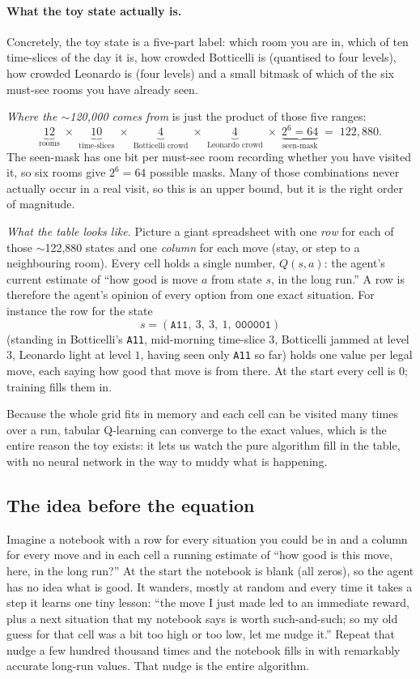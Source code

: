 \documentclass[11pt]{article}
\begin{document}
\paragraph{What the toy state actually is.} Concretely, the toy state is a five-part label: which room
you are in, which of ten time-slices of the day it is, how crowded Botticelli is (quantised to four
levels), how crowded Leonardo is (four levels) and a small bitmask of which of the six must-see rooms
you have already seen.

\emph{Where the $\sim$120{,}000 comes from} is just the product of those five ranges:
\[
\underbrace{12}_{\text{rooms}}\;\times\;\underbrace{10}_{\text{time-slices}}\;\times\;\underbrace{4}_{\text{Botticelli crowd}}\;\times\;\underbrace{4}_{\text{Leonardo crowd}}\;\times\;\underbrace{2^{6}=64}_{\text{seen-mask}}\;=\;122{,}880 .
\]
The seen-mask has one bit per must-see room recording whether you have visited it, so six rooms give
$2^6=64$ possible masks. Many of those combinations never actually occur in a real visit, so this is an
upper bound, but it is the right order of magnitude.

\emph{What the table looks like.} Picture a giant spreadsheet with one \emph{row} for each of those
$\sim$122{,}880 states and one \emph{column} for each move (stay, or step to a neighbouring room). Every
cell holds a single number, $Q(s,a)$: the agent's current estimate of ``how good is move $a$ from state
$s$, in the long run.'' A row is therefore the agent's opinion of every option from one exact situation.
For instance the row for the state
\[
s=(\texttt{A11},\ 3,\ 3,\ 1,\ \texttt{000001})
\]
(standing in Botticelli's \texttt{A11}, mid-morning time-slice $3$, Botticelli jammed at level $3$,
Leonardo light at level $1$, having seen only \texttt{A11} so far) holds one value per legal move, each
saying how good that move is from there. At the start every cell is $0$; training fills them in.

Because the whole grid fits in memory and each cell can be visited many times over a run, tabular
Q-learning can converge to the exact values, which is the entire reason the toy exists: it lets us watch
the pure algorithm fill in the table, with no neural network in the way to muddy what is happening.

\subsection{The idea before the equation}

Imagine a notebook with a row for every situation you could be in and a column for every
move and in each cell a running estimate of ``how good is this move, here, in the long
run?'' At the start the notebook is blank (all zeros), so the agent has no idea what is
good. It wanders, mostly at random and every time it takes a step it learns one tiny
lesson: ``the move I just made led to an immediate reward, plus a next situation that my
notebook says is worth such-and-such; so my old guess for that cell was a bit too high or
too low, let me nudge it.'' Repeat that nudge a few hundred thousand times and the
notebook fills in with remarkably accurate long-run values. That nudge is the entire
algorithm.
\end{document}
